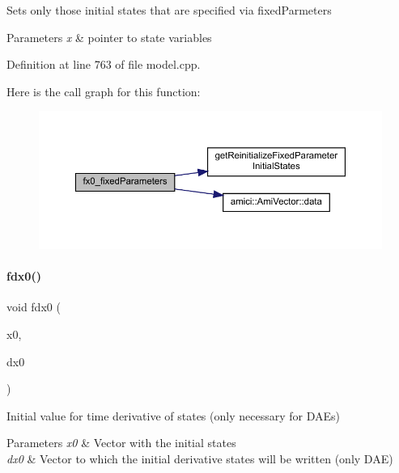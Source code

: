 Sets only those initial states that are specified via fixed\+Parmeters 
\begin{DoxyParams}{Parameters}
{\em x} & pointer to state variables \\
\hline
\end{DoxyParams}


Definition at line 763 of file model.\+cpp.

Here is the call graph for this function\+:
\nopagebreak
\begin{figure}[H]
\begin{center}
\leavevmode
\includegraphics[width=350pt]{classamici_1_1_model_ae517574d2a7c504c388438a08a1aed38_cgraph}
\end{center}
\end{figure}
\mbox{\label{classamici_1_1_model_a8c3a1647a75581d9e2fc5de106d87a0d}} 
\paragraph{\texorpdfstring{fdx0()}{fdx0()}}
{\footnotesize\ttfamily void fdx0 (\begin{DoxyParamCaption}\item[{\mbox{\hyperlink{classamici_1_1_ami_vector}{Ami\+Vector}} $\ast$}]{x0,  }\item[{\mbox{\hyperlink{classamici_1_1_ami_vector}{Ami\+Vector}} $\ast$}]{dx0 }\end{DoxyParamCaption})\hspace{0.3cm}{\ttfamily [virtual]}}

Initial value for time derivative of states (only necessary for D\+A\+Es) 
\begin{DoxyParams}{Parameters}
{\em x0} & Vector with the initial states \\
\hline
{\em dx0} & Vector to which the initial derivative states will be written (only D\+AE) \\
\hline
\end{DoxyParams}



